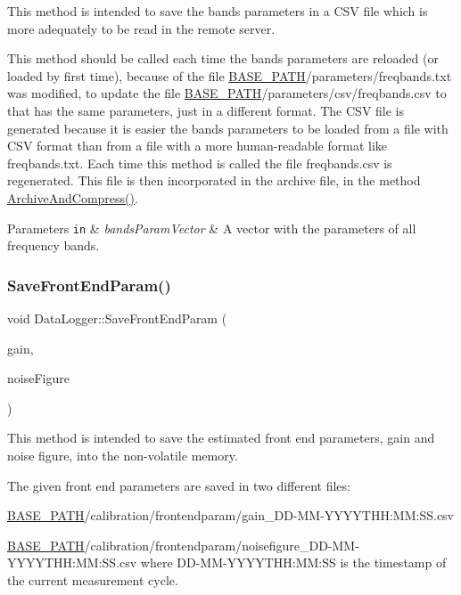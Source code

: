 This method is intended to save the bands parameters in a C\+SV file which is more adequately to be read in the remote server. 

This method should be called each time the bands\textquotesingle{} parameters are reloaded (or loaded by first time), because of the file \hyperlink{Basics_8h_a0423f4cb393331ce0b9f6b3a43adcaae}{B\+A\+S\+E\+\_\+\+P\+A\+TH}/parameters/freqbands.txt was modified, to update the file \hyperlink{Basics_8h_a0423f4cb393331ce0b9f6b3a43adcaae}{B\+A\+S\+E\+\_\+\+P\+A\+TH}/parameters/csv/freqbands.csv to that has the same parameters, just in a different format. The C\+SV file is generated because it is easier the bands\textquotesingle{} parameters to be loaded from a file with C\+SV format than from a file with a more human-\/readable format like freqbands.\+txt. Each time this method is called the file freqbands.\+csv is regenerated. This file is then incorporated in the archive file, in the method \hyperlink{classDataLogger_a147fb7eaee1c38bbf57ef2d6cddf70d5}{Archive\+And\+Compress()}. 
\begin{DoxyParams}[1]{Parameters}
\mbox{\tt in}  & {\em bands\+Param\+Vector} & A vector with the parameters of all frequency bands. \\
\hline
\end{DoxyParams}
\mbox{\label{classDataLogger_a058ed66d04269e7d37501ecfe775c067}} 
\subsubsection{\texorpdfstring{Save\+Front\+End\+Param()}{SaveFrontEndParam()}}
{\footnotesize\ttfamily void Data\+Logger\+::\+Save\+Front\+End\+Param (\begin{DoxyParamCaption}\item[{const \hyperlink{structFreqValues}{Freq\+Values} \&}]{gain,  }\item[{const \hyperlink{structFreqValues}{Freq\+Values} \&}]{noise\+Figure }\end{DoxyParamCaption})}



This method is intended to save the estimated front end parameters, gain and noise figure, into the non-\/volatile memory. 

The given front end parameters are saved in two different files\+:
\begin{DoxyItemize}
\item \hyperlink{Basics_8h_a0423f4cb393331ce0b9f6b3a43adcaae}{B\+A\+S\+E\+\_\+\+P\+A\+TH}/calibration/frontendparam/gain\+\_\+\+D\+D-\/\+M\+M-\/\+Y\+Y\+Y\+Y\+T\+HH\+:MM\+:S\+S.\+csv
\item \hyperlink{Basics_8h_a0423f4cb393331ce0b9f6b3a43adcaae}{B\+A\+S\+E\+\_\+\+P\+A\+TH}/calibration/frontendparam/noisefigure\+\_\+\+D\+D-\/\+M\+M-\/\+Y\+Y\+Y\+Y\+T\+HH\+:MM\+:S\+S.\+csv where D\+D-\/\+M\+M-\/\+Y\+Y\+Y\+Y\+T\+HH\+:MM\+:SS is the timestamp of the current measurement cycle.
\end{DoxyItemize}

